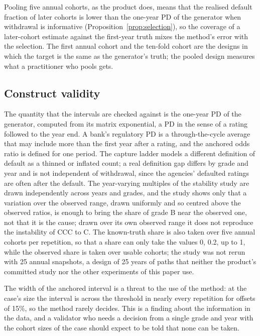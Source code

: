 Pooling five annual cohorts, as the product does, means that the realised default fraction of later cohorts is lower than the one-year PD of the generator when withdrawal is informative (Proposition~\ref{prop:selection}), so the coverage of a later-cohort estimate against the first-year truth mixes the method's error with the selection. The first annual cohort and the ten-fold cohort are the designs in which the target is the same as the generator's truth; the pooled design measures what a practitioner who pools gets.

\subsection{Construct validity}

The quantity that the intervals are checked against is the one-year PD of the generator, computed from its matrix exponential, a PD in the sense of a rating followed to the year end. A bank's regulatory PD is a through-the-cycle average that may include more than the first year after a rating, and the anchored odds ratio is defined for one period. The capture ladder models a different definition of default as a thinned or inflated count; a real definition gap differs by grade and year and is not independent of withdrawal, since the agencies' defaulted ratings are often \wdn{} after the default. The year-varying multiples of the stability study are drawn independently across years and grades, and the study shows only that a variation over the observed range, drawn uniformly and so centred above the observed ratios, is enough to bring the share of grade B near the observed one, not that it is the cause; drawn over its own observed range it does not reproduce the instability of CCC to C. The known-truth share is also taken over five annual cohorts per repetition, so that a share can only take the values 0, 0.2, up to 1, while the observed share is taken over  usable cohorts; the study was not rerun with 25 annual snapshots, a design of 25 years of paths that neither the product's committed study nor the other experiments of this paper use.

The width of the anchored interval is a threat to the use of the method: at the case's size the interval is across the threshold in nearly every repetition for offsets of 15\%, so the method rarely decides. This is a finding about the information in the data, and a validator who needs a decision from a single grade and year with the cohort sizes of the case should expect to be told that none can be taken.

